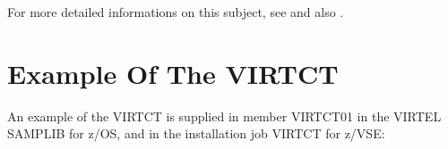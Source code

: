 \documentclass[letterpaper,10pt,english]{sphinxmanual}
\begin{document}
\sphinxAtStartPar
For more detailed informations on this subject, see {\hyperref[\detokenize{Installation_Guide:v461ig-ufile1-to-ufile20-parameters}]{}} and also {\hyperref[\detokenize{Installation_Guide:v461ig-additional-parameters-for-vsam-files}]{}}.

\newpage


\section{Example Of The VIRTCT}
\label{\detokenize{Installation_Guide:example-of-the-virtct}}
\sphinxAtStartPar
An example of the VIRTCT is supplied in member VIRTCT01 in the VIRTEL SAMPLIB for z/OS, and in the installation job VIRTCT for z/VSE:
\end{document}

